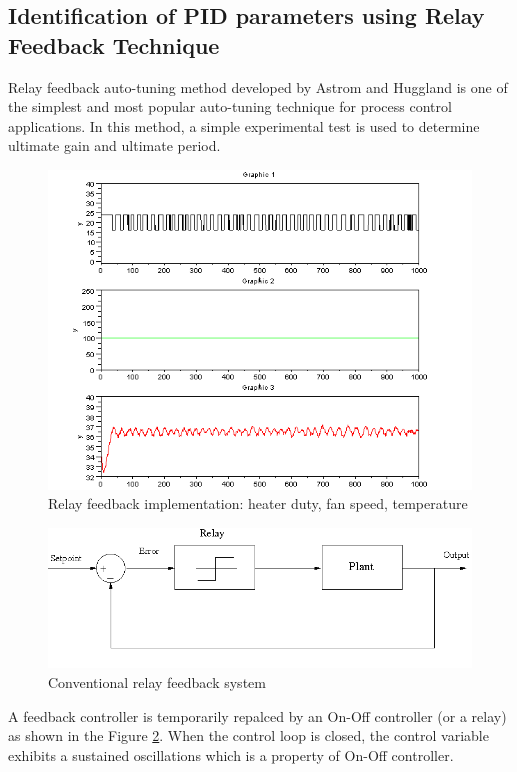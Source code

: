 \subsection{Identification of PID parameters using Relay Feedback Technique}
Relay feedback auto-tuning method developed by Astrom and Huggland is
one of the simplest and most popular auto-tuning technique for process
control applications\cite{karl84}. In this method, a simple
experimental test is used to determine ultimate gain and ultimate
period. 

\begin{figure}
\hspace{-0.2in}
\includegraphics[width=1.2\linewidth]{figures/relay.png}
\caption{Relay feedback implementation: heater duty, fan speed,
  temperature} 
\label{relayresp}
\end{figure}

\begin{figure}
\centering
\includegraphics[width=\linewidth]{figures/relay1.png}
\caption{Conventional relay feedback system}
\label{relaysys}
\end{figure}

A feedback controller is temporarily repalced by an On-Off controller (or a relay) as shown in the Figure \ref{relaysys}. When the control loop is closed, the control variable exhibits a sustained oscillations which is a property of On-Off controller.


